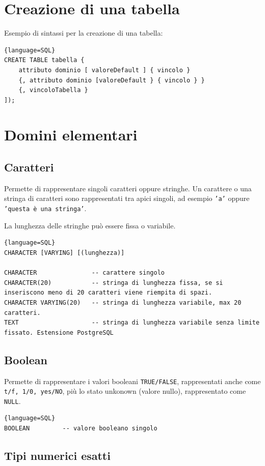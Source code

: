 \documentclass[11pt]{report}
\begin{document}
\section{Creazione di una tabella}
Esempio di sintassi per la creazione di una tabella:
\begin{lstlisting}{language=SQL}
CREATE TABLE tabella {
	attributo dominio [ valoreDefault ] { vincolo }
	{, attributo dominio [valoreDefault } { vincolo } }
	{, vincoloTabella }
]);
\end{lstlisting}

\section{Domini elementari}

\subsection{Caratteri}

Permette di rappresentare singoli caratteri oppure stringhe. Un carattere o una stringa di caratteri sono rappresentati tra apici singoli, ad esempio \texttt{'a'} oppure \texttt{'questa \`e una stringa'}.

La lunghezza delle stringhe pu\`o essere fissa o variabile.

\begin{lstlisting}{language=SQL}
CHARACTER [VARYING] [(lunghezza)]

CHARACTER				-- carattere singolo
CHARACTER(20)			-- stringa di lunghezza fissa, se si inseriscono meno di 20 caratteri viene riempita di spazi.
CHARACTER VARYING(20) 	-- stringa di lunghezza variabile, max 20 caratteri.
TEXT					-- stringa di lunghezza variabile senza limite fissato. Estensione PostgreSQL
\end{lstlisting}

\subsection{Boolean}

Permette di rappresentare i valori booleani \texttt{TRUE/FALSE}, rappresentati anche come \texttt{t/f, 1/0, yes/NO}, pi\`u lo stato unkonown (valore nullo), rappresentato come \texttt{NULL}.

\begin{lstlisting}{language=SQL}
BOOLEAN 		-- valore booleano singolo
\end{lstlisting}

\subsection{Tipi numerici esatti}
\end{document}
